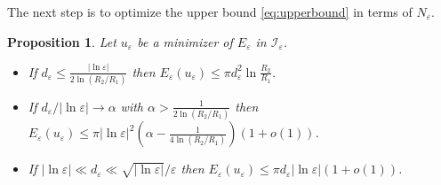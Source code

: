 \documentclass[12pt,reqno]{amsart}
\newtheorem{proposition}[theorem]{Proposition}
\newtheorem{lemma}[theorem]{Lemma}
\def\I{{\mathcal I}}
\def\e {{\varepsilon}}
\numberwithin{equation}{section}
\begin{document}
The next step is to optimize the upper bound \eqref{eq:upperbound} in terms of \(N_\e\). 


\begin{proposition}\label{cor:upper_bound_final}
Let \(u_\e\) be a minimizer of \(E_\e\) in \(\I_\e\).
\begin{itemize}
\item[1)]  If \( d_\e \leq \frac{|\ln \e|}{2\ln( R_2/R_1)}\) then \(E_\e(u_\e)\leq \pi d_\e^2\ln \frac{R_2}{R_1}\).
\item[2)] If \(d_\e/|\ln \e| \to \alpha\) with \(\alpha  > \frac{1}{2\ln ( R_2/R_1)}\) then \(E_\e(u_\e)\leq \pi |\ln \e|^2(\alpha-\frac{1}{4\ln (R_2/R_1)})(1+o(1))\).
\item[3)] If \( |\ln \e| \ll d_\e \ll \sqrt{|\ln \e|}/\e\) then \(E_\e(u_\e) \leq \pi d_\e |\ln \e|(1+o(1))\).
\end{itemize}
\end{proposition}
\end{document}
